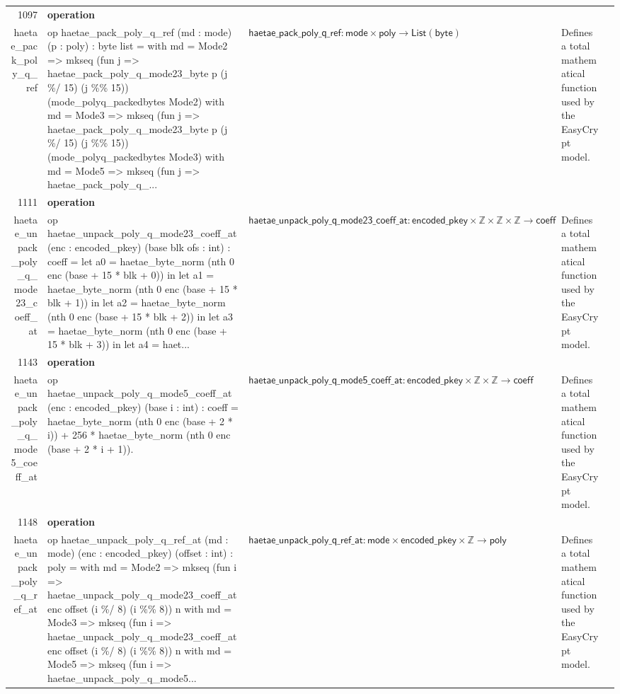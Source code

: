 \documentclass[10pt]{article}
\newcommand{\ec}[1]{\begingroup\ttfamily\scriptsize #1\endgroup}
\begin{document}
\begin{longtable}{r L{0.17\textwidth} L{0.26\textwidth} L{0.27\textwidth} L{0.20\textwidth}}
1097 & \textbf{operation}\\\ec{haetae\_pack\_poly\_q\_ref} & \ec{op haetae\_pack\_poly\_q\_ref (md : mode) (p : poly) : byte list = with md = Mode2 => mkseq (fun j => haetae\_pack\_poly\_q\_mode23\_byte p (j \%/ 15) (j \%\% 15)) (mode\_polyq\_packedbytes Mode2) with md = Mode3 => mkseq (fun j => haetae\_pack\_poly\_q\_mode23\_byte p (j \%/ 15) (j \%\% 15)) (mode\_polyq\_packedbytes Mode3) with md = Mode5 => mkseq (fun j => haetae\_pack\_poly\_q\_...} & \(\mathsf{haetae\_pack\_poly\_q\_ref} : \mathsf{mode} \times \mathsf{poly} \to \mathsf{List}(\mathsf{byte})\) & Defines a total mathematical function used by the EasyCrypt model. \\
1111 & \textbf{operation}\\\ec{haetae\_unpack\_poly\_q\_mode23\_coeff\_at} & \ec{op haetae\_unpack\_poly\_q\_mode23\_coeff\_at (enc : encoded\_pkey) (base blk ofs : int) : coeff = let a0 = haetae\_byte\_norm (nth 0 enc (base + 15 * blk + 0)) in let a1 = haetae\_byte\_norm (nth 0 enc (base + 15 * blk + 1)) in let a2 = haetae\_byte\_norm (nth 0 enc (base + 15 * blk + 2)) in let a3 = haetae\_byte\_norm (nth 0 enc (base + 15 * blk + 3)) in let a4 = haet...} & \(\mathsf{haetae\_unpack\_poly\_q\_mode23\_coeff\_at} : \mathsf{encoded\_pkey} \times \mathbb{Z} \times \mathbb{Z} \times \mathbb{Z} \to \mathsf{coeff}\) & Defines a total mathematical function used by the EasyCrypt model. \\
1143 & \textbf{operation}\\\ec{haetae\_unpack\_poly\_q\_mode5\_coeff\_at} & \ec{op haetae\_unpack\_poly\_q\_mode5\_coeff\_at (enc : encoded\_pkey) (base i : int) : coeff = haetae\_byte\_norm (nth 0 enc (base + 2 * i)) + 256 * haetae\_byte\_norm (nth 0 enc (base + 2 * i + 1)).} & \(\mathsf{haetae\_unpack\_poly\_q\_mode5\_coeff\_at} : \mathsf{encoded\_pkey} \times \mathbb{Z} \times \mathbb{Z} \to \mathsf{coeff}\) & Defines a total mathematical function used by the EasyCrypt model. \\
1148 & \textbf{operation}\\\ec{haetae\_unpack\_poly\_q\_ref\_at} & \ec{op haetae\_unpack\_poly\_q\_ref\_at (md : mode) (enc : encoded\_pkey) (offset : int) : poly = with md = Mode2 => mkseq (fun i => haetae\_unpack\_poly\_q\_mode23\_coeff\_at enc offset (i \%/ 8) (i \%\% 8)) n with md = Mode3 => mkseq (fun i => haetae\_unpack\_poly\_q\_mode23\_coeff\_at enc offset (i \%/ 8) (i \%\% 8)) n with md = Mode5 => mkseq (fun i => haetae\_unpack\_poly\_q\_mode5...} & \(\mathsf{haetae\_unpack\_poly\_q\_ref\_at} : \mathsf{mode} \times \mathsf{encoded\_pkey} \times \mathbb{Z} \to \mathsf{poly}\) & Defines a total mathematical function used by the EasyCrypt model. \\

\end{longtable}
\end{document}
